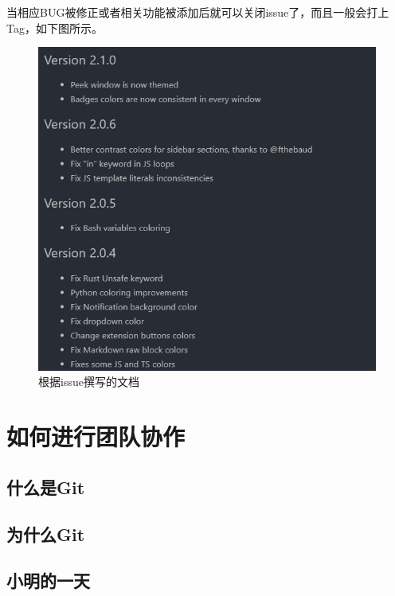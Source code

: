 \documentclass[UTF8,oneside]{ctexbook}
\begin{document}
当相应BUG被修正或者相关功能被添加后就可以关闭issue了，而且一般会打上Tag，如下图所示。
\begin{figure}[H]
	\centering
	\includegraphics[width=0.6\linewidth]{Pics/issue9.png}
	\vspace{-0.3cm}
	\caption{根据issue撰写的文档}\label{fig:issue9}
\end{figure}

\chapter{如何进行团队协作}
\section{什么是Git}
\section{为什么Git}
\section{小明的一天}
\end{document}
